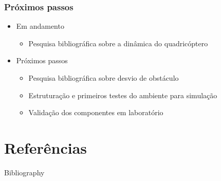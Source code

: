 \documentclass{beamer}
\begin{document}
\begin{frame}
	
	\frametitle{Próximos passos}
	
	\begin{itemize}	
		
		\item Em andamento
		
		\begin{itemize}
			\item Pesquisa bibliográfica sobre a dinâmica do quadricóptero
		\end{itemize}
		
		
		\item Próximos passos
		
		\begin{itemize}
			\item Pesquisa bibliográfica sobre desvio de obstáculo
			
			\item Estruturação e primeiros testes do ambiente para simulação
			
			\item Validação dos componentes em laboratório 
		\end{itemize}
		
	\end{itemize}	
	
	
\end{frame}

\section*{Referências}


\begin{frame}[allowframebreaks]{Bibliography}
	\frametitle{\insertsection}
	
	\footnotesize
\end{frame}


\end{document}
